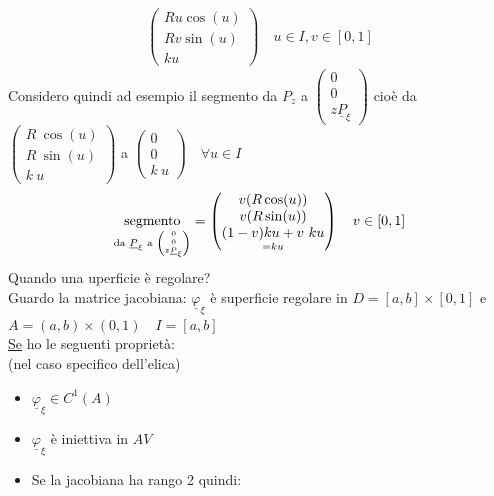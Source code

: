 \documentclass[a4paper, oneside]{article}
\begin{document}
\begin{example}
\begin{gather*}
\begin{pmatrix}
          R u \cos(u)\\
          R v \sin(u)\\
          k u
        \end{pmatrix} \quad u \in I, v \in [0,1]
      \end{gather*}
      Considero quindi ad esempio il segmento da $P_z$ a $\begin{pmatrix}
        0\\
        0\\
        z \underline{P}_\xi
      \end{pmatrix}$ 
      cioè da $\begin{pmatrix}
        R \ \cos(u)\\
        R \ \sin(u)\\
        k \ u
      \end{pmatrix}$ a $\begin{pmatrix}
        0\\
        0\\
        k \ u
      \end{pmatrix} \quad \forall u \in I$
      \begin{gather*}
        \underset{\tiny \text{da } \underline{P}_\xi \text{ a } \begin{pmatrix}
          0\\
          0\\
          z \underline{P}_\xi
        \end{pmatrix}}{\text{segmento}} = \begin{pmatrix}
          v(R  \cos(u))\\
          v(R  \sin(u))\\
          \underset{= ku}{(1-v) ku + v \ ku}
        \end{pmatrix} \quad v \in [0,1]
      \end{gather*}
      Quando una uperficie è regolare?\\
      Guardo la matrice jacobiana:
        $\underline{\varphi}_\xi$ è superficie regolare in $D = [a,b] \times [0,1]$ e $A = (a,b) \times (0,1) \quad I = [a,b]$\\
        \underline{Se} ho le seguenti proprietà:\\
        (nel caso specifico dell'elica)
        \begin{itemize}
          \item $\underline{\varphi}_\xi \in C^1(A)$
          \item $\underline{\varphi}_\xi$ è iniettiva in $AV$
          \item Se la jacobiana ha rango 2 quindi:\\

\end{itemize}
\end{example}
\end{document}
